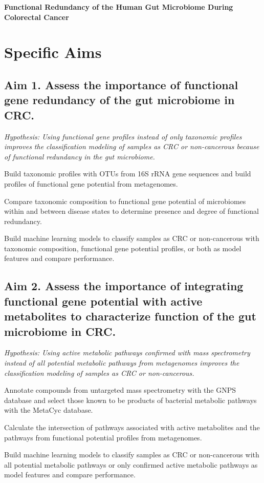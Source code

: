 \documentclass[12pt]{article}
\begin{document}
\sloppy
\begin{center}\large{\textbf{Functional Redundancy of the Human Gut Microbiome During Colorectal Cancer}}\end{center}
\section*{Specific Aims}

\subsection*{Aim 1. Assess the importance of functional gene redundancy of the gut microbiome in CRC.}
\textit{Hypothesis: Using functional gene profiles instead of only taxonomic profiles improves the classification modeling of samples as CRC or non-cancerous because of functional redundancy in the gut microbiome.}
\begin{compactenum}[A.]
    \item Build taxonomic profiles with OTUs from 16S rRNA gene sequences and build profiles of functional gene potential from metagenomes.
    \item Compare taxonomic composition to functional gene potential of microbiomes within and between disease states to determine presence and degree of functional redundancy.
    \item Build machine learning models to classify samples as CRC or non-cancerous with taxonomic composition, functional gene potential profiles, or both as model features and compare performance.
\end{compactenum}

\subsection*{Aim 2. Assess the importance of integrating functional gene potential with active metabolites to characterize function of the gut microbiome in CRC.}
\textit{Hypothesis: Using active metabolic pathways confirmed with mass spectrometry instead of all potential metabolic pathways from metagenomes improves the classification modeling of samples as CRC or non-cancerous.}
\begin{compactenum}[A.]
    \item Annotate compounds from untargeted mass spectrometry with the GNPS database and select those known to be products of bacterial metabolic pathways with the MetaCyc database.
    \item Calculate the intersection of pathways associated with active metabolites and the pathways from functional potential profiles from metagenomes.
    \item Build machine learning models to classify samples as CRC or non-cancerous with all potential metabolic pathways or only confirmed active metabolic pathways as model features and compare performance.
\end{compactenum}


\pagebreak

\footnotesize{

\par}
\end{document}
